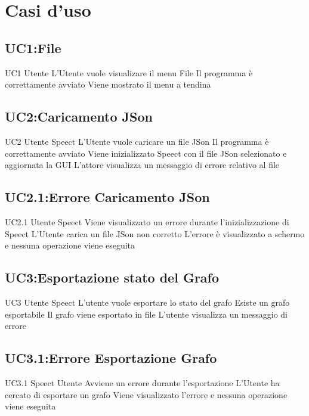 \documentclass[../AnalisideiRequisiti.tex]{subfiles}
\begin{document}
	\chapter{Casi d'uso}
	\section{UC1:File}
	\UserCase
	{UC1}
	{Utente}
	{}
	{L'Utente vuole visualizare il menu File}
	{Il programma è correttamente avviato}
	{Viene mostrato il menu a tendina}
	{}
	{}
	\section{UC2:Caricamento JSon}
	\UserCase
	{UC2}
	{Utente}
	{Speect}
	{L'Utente vuole caricare un file JSon}
	{Il programma è correttamente avviato}
	{Viene inizializzato Speect con il file JSon selezionato e aggiornata la GUI}
	{L'attore visualizza un messaggio di errore relativo al file }
	{}
	\section{UC2.1:Errore Caricamento JSon}
	\UserCase
	{UC2.1}
	{Utente}
	{Speect}
	{Viene visualizzato un errore durante l'inizializzazione di Speect}
	{L'Utente carica un file JSon non corretto}
	{L'errore è visualizzato a schermo e nessuna operazione viene eseguita}
	{}
	{}
	\section{UC3:Esportazione stato del Grafo}
	\UserCase
	{UC3}
	{Utente}
	{Speect}
	{L'utente vuole esportare lo stato del grafo}
	{Esiste un grafo esportabile}
	{Il grafo viene esportato in file}
	{ L'utente visualizza un messaggio di errore }
	{}
\section{UC3.1:Errore Esportazione Grafo}
\UserCase
{UC3.1}
{Speect}
{Utente}
{Avviene un errore durante l'esportazione}
{L'Utente ha cercato di esportare un grafo}
{Viene visualizzato l'errore e nessuna operazione viene eseguita}
{}
{}
\end{document}

